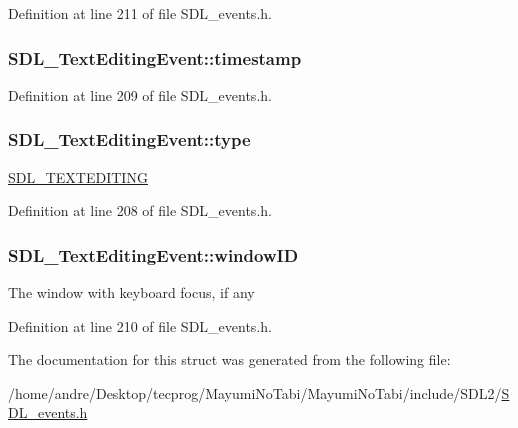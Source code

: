 Definition at line 211 of file S\-D\-L\-\_\-events.\-h.

\hypertarget{struct_s_d_l___text_editing_event_afc164f40abee6fd8e72e01b589210c75}{
\subsubsection[{timestamp}]{ S\-D\-L\-\_\-\-Text\-Editing\-Event\-::timestamp}}\label{struct_s_d_l___text_editing_event_afc164f40abee6fd8e72e01b589210c75}


Definition at line 209 of file S\-D\-L\-\_\-events.\-h.

\hypertarget{struct_s_d_l___text_editing_event_a198e6df194a3bf12cf5f82553e84c7cb}{
\subsubsection[{type}]{ S\-D\-L\-\_\-\-Text\-Editing\-Event\-::type}}\label{struct_s_d_l___text_editing_event_a198e6df194a3bf12cf5f82553e84c7cb}
\hyperlink{_s_d_l__events_8h_a3b589e89be6b35c02e0dd34a55f3fccaa1b80c465df69c0b6d06f026ce7a230e3}{S\-D\-L\-\_\-\-T\-E\-X\-T\-E\-D\-I\-T\-I\-N\-G} 

Definition at line 208 of file S\-D\-L\-\_\-events.\-h.

\hypertarget{struct_s_d_l___text_editing_event_a23b3e414cf7a7ccc547b7595ca930049}{
\subsubsection[{window\-I\-D}]{ S\-D\-L\-\_\-\-Text\-Editing\-Event\-::window\-I\-D}}\label{struct_s_d_l___text_editing_event_a23b3e414cf7a7ccc547b7595ca930049}
The window with keyboard focus, if any 

Definition at line 210 of file S\-D\-L\-\_\-events.\-h.



The documentation for this struct was generated from the following file\-:\begin{DoxyCompactItemize}
\item 
/home/andre/\-Desktop/tecprog/\-Mayumi\-No\-Tabi/\-Mayumi\-No\-Tabi/include/\-S\-D\-L2/\hyperlink{_s_d_l__events_8h}{S\-D\-L\-\_\-events.\-h}\end{DoxyCompactItemize}
